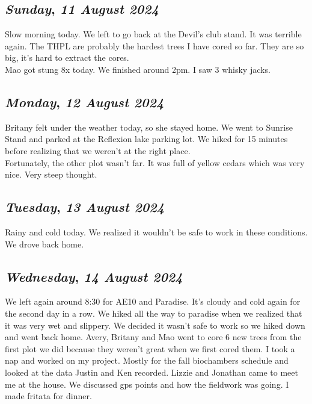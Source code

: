 \def\day{\textit{11 August 2024}}
\def\weekday{\textit{Sunday}}
\subsection*{\weekday, \day}
Slow morning today. We left to go back at the Devil's club stand. It was terrible again. The THPL are probably the hardest trees I have cored so far. They are so big, it's hard to extract the cores.\\
Mao got stung 8x today.  We finished around 2pm. I saw 3 whisky jacks. 

\def\day{\textit{12 August 2024}}
\def\weekday{\textit{Monday}}
\subsection*{\weekday, \day}
Britany felt under the weather today, so she stayed home. We went to Sunrise Stand and parked at the Reflexion lake parking lot. We hiked for 15 minutes before realizing that we weren't at the right place. \\
Fortunately, the other plot wasn't far. It was full of yellow cedars which was very nice. Very steep thought.

\def\day{\textit{13 August 2024}}
\def\weekday{\textit{Tuesday}}
\subsection*{\weekday, \day}
Rainy and cold today. We realized it wouldn't be safe to work in these conditions. We drove back home. 

\def\day{\textit{14 August 2024}}
\def\weekday{\textit{Wednesday}}
\subsection*{\weekday, \day}
We left again around 8:30 for AE10 and Paradise. It's cloudy and cold again for the second day in a row. We hiked all the way to paradise when we realized that it was very wet and slippery. We decided it wasn't safe to work so we hiked down and went back home. Avery, Britany and Mao went to core 6 new trees from the first plot we did because they weren't great when we first cored them. I took a nap and worked on my project. Mostly for the fall biochambers schedule and looked at the data Justin and Ken recorded.
Lizzie and Jonathan came to meet me at the house. We discussed gps points and how the fieldwork was going. I made fritata for dinner.

